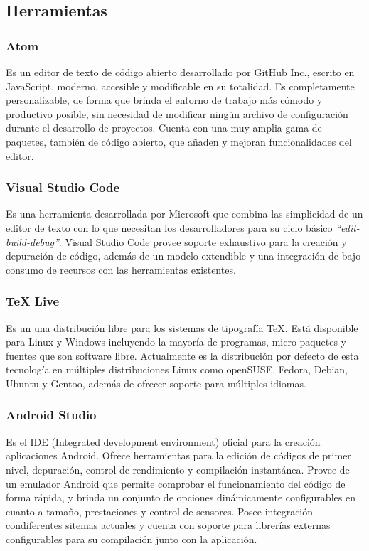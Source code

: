 \documentclass[12pt]{article}
\begin{document}
    \subsection{Herramientas} 
        \subsubsection{Atom}
            Es un editor de texto de código abierto desarrollado por GitHub Inc., escrito en JavaScript, moderno, accesible y modificable en su totalidad. Es completamente personalizable, de forma que brinda el entorno de trabajo más cómodo y productivo posible, sin necesidad de modificar ningún archivo de configuración durante el desarrollo de proyectos. Cuenta con una muy amplia gama de paquetes, también de código abierto, que añaden y mejoran funcionalidades del editor.

        \subsubsection{Visual Studio Code}
            Es una herramienta desarrollada por Microsoft que combina las simplicidad de un editor de texto con lo que necesitan los desarrolladores para su ciclo básico \textit{``edit-build-debug''}. Visual Studio Code provee soporte exhaustivo para la creación y depuración de código, además de un modelo extendible y una integración de bajo consumo de recursos con las herramientas existentes.

        \subsubsection{TeX Live}
            Es un una distribución libre para los sistemas de tipografía TeX. Está disponible para Linux y Windows incluyendo la mayoría de programas, micro paquetes y fuentes que son software libre. Actualmente es la distribución por defecto de esta tecnología en múltiples distribuciones Linux como openSUSE, Fedora, Debian, Ubuntu y Gentoo, además de ofrecer soporte para múltiples idiomas.

        \subsubsection{Android Studio}
            Es el IDE (Integrated development environment) oficial para la creación aplicaciones Android. Ofrece herramientas para la edición de códigos de primer nivel, depuración, control de rendimiento y compilación instantánea. Provee de un emulador Android que permite comprobar el funcionamiento del código de forma rápida, y brinda un conjunto de opciones dinámicamente configurables en cuanto a tamaño, prestaciones y control de sensores. Posee integración condiferentes sitemas actuales y cuenta con soporte para librerías externas configurables para su compilación junto con la aplicación.
\end{document}
